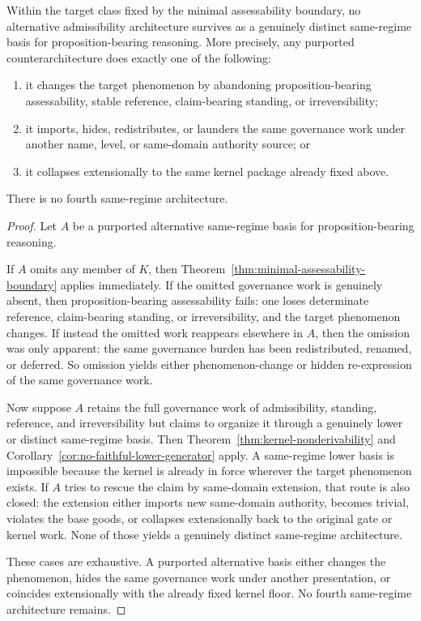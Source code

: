 \begin{theorem}
\label{thm:kernel-architecture-exhaustion}
Within the target class fixed by the minimal assessability boundary, no alternative admissibility architecture survives as a genuinely distinct same-regime basis for proposition-bearing reasoning. More precisely, any purported counterarchitecture does exactly one of the following:
\begin{enumerate}
  \item it changes the target phenomenon by abandoning proposition-bearing assessability, stable reference, claim-bearing standing, or irreversibility;
  \item it imports, hides, redistributes, or launders the same governance work under another name, level, or same-domain authority source; or
  \item it collapses extensionally to the same kernel package already fixed above.
\end{enumerate}
There is no fourth same-regime architecture.
\end{theorem}

\begin{proof}
Let $A$ be a purported alternative same-regime basis for proposition-bearing reasoning.

If $A$ omits any member of $K$, then Theorem~\ref{thm:minimal-assessability-boundary} applies immediately. If the omitted governance work is genuinely absent, then proposition-bearing assessability fails: one loses determinate reference, claim-bearing standing, or irreversibility, and the target phenomenon changes. If instead the omitted work reappears elsewhere in $A$, then the omission was only apparent: the same governance burden has been redistributed, renamed, or deferred. So omission yields either phenomenon-change or hidden re-expression of the same governance work.

Now suppose $A$ retains the full governance work of admissibility, standing, reference, and irreversibility but claims to organize it through a genuinely lower or distinct same-regime basis. Then Theorem~\ref{thm:kernel-nonderivability} and Corollary~\ref{cor:no-faithful-lower-generator} apply. A same-regime lower basis is impossible because the kernel is already in force wherever the target phenomenon exists. If $A$ tries to rescue the claim by same-domain extension, that route is also closed: the extension either imports new same-domain authority, becomes trivial, violates the base goods, or collapses extensionally back to the original gate or kernel work. None of those yields a genuinely distinct same-regime architecture.

These cases are exhaustive. A purported alternative basis either changes the phenomenon, hides the same governance work under another presentation, or coincides extensionally with the already fixed kernel floor. No fourth same-regime architecture remains.\cite{MaleyFoundationalClosure,MaleyNecessity}
\end{proof}

